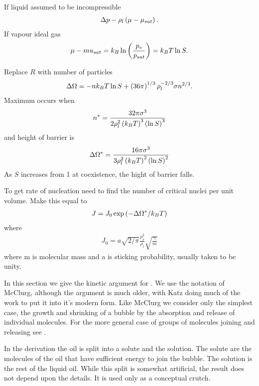 If liquid assumed to be incompressible
\begin{align}
\Delta p - \rho_l\left( \mu - \mu_{sat} \right).
\end{align}
If vapour ideal gas
\begin{align}
  \mu - mu_{sat} = k_B \ln\left( \frac{p_v}{p_{sat}} \right) = k_B T \ln S.
\end{align}

Replace $R$ with number of particles
\begin{align}
\Delta \Omega=-nk_B T \ln S + \left( 36 \pi \right)^{1/3} \rho_l^{-2/3} \sigma n^{2/3}.
\end{align}
Maximum occurs when 
\begin{align}
n^\ast = \frac{32 \pi \sigma^3}{2\rho_l^2 \left( k_B T \right)^3 \left( \ln S \right)^3}
\end{align}
and height of barrier is
\begin{align}
  \Delta \Omega^\ast = \frac{16\pi \sigma^3}{3\rho_l^2 \left( k_B T \right)^2\left( \ln S \right)^2}
\end{align}
As $S$ increases from 1 at coexistence, the hight of barrier falls.

To get rate of nucleation need to find the number of critical nuclei per unit volume.
Make this equal to 
\begin{align}
  J = J_0 \exp\left( -\Delta \Omega^\ast / k_B T \right)
\end{align}
where 
\begin{align}
J_0 = a \sqrt{2/\pi}\frac{\rho_v^2}{\rho_l} \sqrt{\frac{\gamma}{m}}
\end{align}
where m is molecular mass and a is sticking probability, usually taken to be unity.






In this section we give the kinetic argument for \cnt.
We use the notation of McClurg\cite{},
although the argument is much older, with Katz\cite{} doing much of the work to put it into it's modern form.
Like McClurg we consider only the simplest case, 
the  growth and shrinking of a bubble by the absorption and release of individual molecules.
For the more general case of groups of molecules joining and releasing see \cite{}.

In the derivation the oil is split into a solute and the solution.
The solute are the molecules of the oil that have sufficient energy to join the bubble.
The solution is the rest of the liquid oil.
While this split is somewhat artificial,
the result does not depend upon the details.
It is used only as a conceptual crutch.



